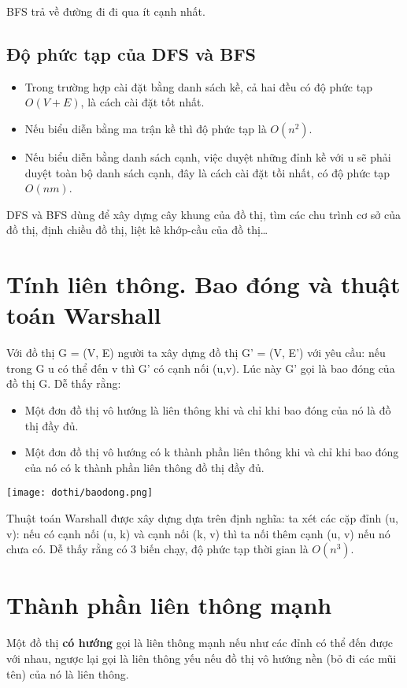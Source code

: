 BFS trả về đường đi đi qua ít cạnh nhất.

\subsection{Độ phức tạp của DFS và BFS}
\begin{itemize}
    \item Trong trường hợp cài đặt bằng danh sách kề, cả hai đều có độ phức tạp $O(V+E)$, là cách cài đặt tốt nhất.
    \item Nếu biểu diễn bằng ma trận kề thì độ phức tạp là $O(n^2)$.
    \item Nếu biểu diễn bằng danh sách cạnh, việc duyệt những đỉnh kề với u sẽ phải duyệt toàn bộ danh sách cạnh, đây là cách cài đặt tồi nhất, có độ phức tạp $O(nm)$.
\end{itemize}

DFS và BFS dùng để xây dựng cây khung của đồ thị, tìm các chu trình cơ sở của đồ thị, định chiều đồ thị, liệt kê khớp-cầu của đồ thị\dots

\section{Tính liên thông. Bao đóng và thuật toán Warshall}
Với đồ thị G = (V, E) người ta xây dựng đồ thị G' = (V, E') với yêu cầu: nếu trong G u có thể đến v thì G' có cạnh nối (u,v). Lúc này G' gọi là bao đóng của đồ thị G. Dễ thấy rằng:
\begin{itemize}
    \item Một đơn đồ thị vô hướng là liên thông khi và chỉ khi bao đóng của nó là đồ thị đầy đủ.
    \item Một đơn đồ thị vô hướng có k thành phần liên thông khi và chỉ khi bao đóng của nó có k thành phần liên thông đồ thị đầy đủ.
\end{itemize}

\texttt{[image: dothi/baodong.png]}

Thuật toán Warshall được xây dựng dựa trên định nghĩa: ta xét các cặp đỉnh (u, v): nếu có cạnh nối (u, k) và cạnh nối (k, v) thì ta nối thêm cạnh (u, v) nếu nó chưa có. Dễ thấy rằng có 3 biến chạy, độ phức tạp thời gian là $O(n^3)$.

\section{Thành phần liên thông mạnh}
Một đồ thị \textbf{có hướng} gọi là liên thông mạnh nếu như các đỉnh có thể đến được với nhau, ngược lại gọi là liên thông yếu nếu đồ thị vô hướng nền (bỏ đi các mũi tên) của nó là liên thông.

